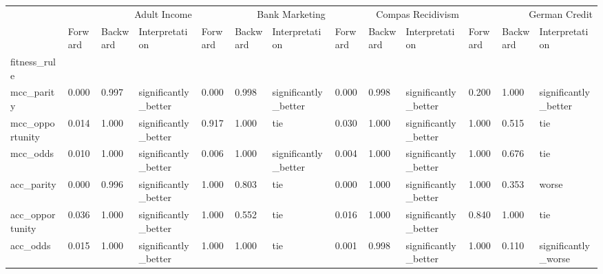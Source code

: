 \begin{tabular}{lllllllllllll}
\toprule
 & \multicolumn{3}{r}{Adult Income} & \multicolumn{3}{r}{Bank Marketing} & \multicolumn{3}{r}{Compas Recidivism} & \multicolumn{3}{r}{German Credit} \\
 & Forward & Backward & Interpretation & Forward & Backward & Interpretation & Forward & Backward & Interpretation & Forward & Backward & Interpretation \\
fitness_rule &  &  &  &  &  &  &  &  &  &  &  &  \\
\midrule
mcc_parity & 0.000 & 0.997 & significantly_better & 0.000 & 0.998 & significantly_better & 0.000 & 0.998 & significantly_better & 0.200 & 1.000 & significantly_better \\
mcc_opportunity & 0.014 & 1.000 & significantly_better & 0.917 & 1.000 & tie & 0.030 & 1.000 & significantly_better & 1.000 & 0.515 & tie \\
mcc_odds & 0.010 & 1.000 & significantly_better & 0.006 & 1.000 & significantly_better & 0.004 & 1.000 & significantly_better & 1.000 & 0.676 & tie \\
acc_parity & 0.000 & 0.996 & significantly_better & 1.000 & 0.803 & tie & 0.000 & 1.000 & significantly_better & 1.000 & 0.353 & worse \\
acc_opportunity & 0.036 & 1.000 & significantly_better & 1.000 & 0.552 & tie & 0.016 & 1.000 & significantly_better & 0.840 & 1.000 & tie \\
acc_odds & 0.015 & 1.000 & significantly_better & 1.000 & 1.000 & tie & 0.001 & 0.998 & significantly_better & 1.000 & 0.110 & significantly_worse \\
\bottomrule
\end{tabular}
